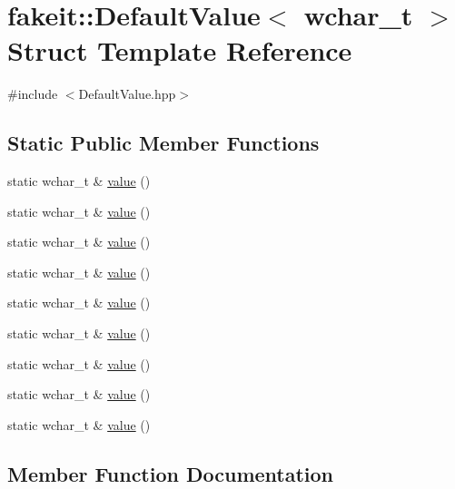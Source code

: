 \hypertarget{structfakeit_1_1DefaultValue_3_01wchar__t_01_4}{}\section{fakeit\+::Default\+Value$<$ wchar\+\_\+t $>$ Struct Template Reference}
\label{structfakeit_1_1DefaultValue_3_01wchar__t_01_4}


{\ttfamily \#include $<$Default\+Value.\+hpp$>$}

\subsection*{Static Public Member Functions}
\begin{DoxyCompactItemize}
\item 
static wchar\+\_\+t \& \mbox{\hyperlink{structfakeit_1_1DefaultValue_3_01wchar__t_01_4_aa6bedce29b3176a4996c7d95e5a4cb0c}{value}} ()
\item 
static wchar\+\_\+t \& \mbox{\hyperlink{structfakeit_1_1DefaultValue_3_01wchar__t_01_4_aa6bedce29b3176a4996c7d95e5a4cb0c}{value}} ()
\item 
static wchar\+\_\+t \& \mbox{\hyperlink{structfakeit_1_1DefaultValue_3_01wchar__t_01_4_aa6bedce29b3176a4996c7d95e5a4cb0c}{value}} ()
\item 
static wchar\+\_\+t \& \mbox{\hyperlink{structfakeit_1_1DefaultValue_3_01wchar__t_01_4_aa6bedce29b3176a4996c7d95e5a4cb0c}{value}} ()
\item 
static wchar\+\_\+t \& \mbox{\hyperlink{structfakeit_1_1DefaultValue_3_01wchar__t_01_4_aa6bedce29b3176a4996c7d95e5a4cb0c}{value}} ()
\item 
static wchar\+\_\+t \& \mbox{\hyperlink{structfakeit_1_1DefaultValue_3_01wchar__t_01_4_aa6bedce29b3176a4996c7d95e5a4cb0c}{value}} ()
\item 
static wchar\+\_\+t \& \mbox{\hyperlink{structfakeit_1_1DefaultValue_3_01wchar__t_01_4_aa6bedce29b3176a4996c7d95e5a4cb0c}{value}} ()
\item 
static wchar\+\_\+t \& \mbox{\hyperlink{structfakeit_1_1DefaultValue_3_01wchar__t_01_4_aa6bedce29b3176a4996c7d95e5a4cb0c}{value}} ()
\item 
static wchar\+\_\+t \& \mbox{\hyperlink{structfakeit_1_1DefaultValue_3_01wchar__t_01_4_aa6bedce29b3176a4996c7d95e5a4cb0c}{value}} ()
\end{DoxyCompactItemize}


\subsection{Member Function Documentation}
\mbox{\label{structfakeit_1_1DefaultValue_3_01wchar__t_01_4_aa6bedce29b3176a4996c7d95e5a4cb0c}} 
